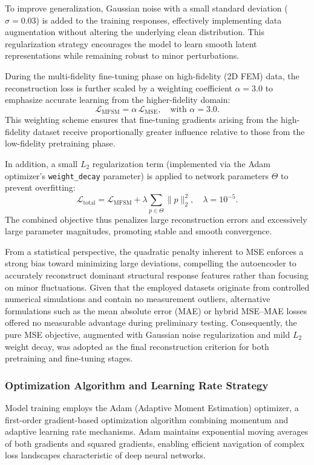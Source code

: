 \documentclass[12pt,a4paper]{report}
\begin{document}
To improve generalization, Gaussian noise with a small standard deviation ($\sigma = 0.03$) is added to the training responses, effectively implementing data augmentation without altering the underlying clean distribution. This regularization strategy encourages the model to learn smooth latent representations while remaining robust to minor perturbations.

During the multi-fidelity fine-tuning phase on high-fidelity (2D FEM) data, the reconstruction loss is further scaled by a weighting coefficient $\alpha = 3.0$ to emphasize accurate learning from the higher-fidelity domain:
\[
\mathcal{L}_{\text{MFSM}} = \alpha \, \mathcal{L}_{\text{MSE}}, \quad \text{with } \alpha = 3.0.
\]
This weighting scheme ensures that fine-tuning gradients arising from the high-fidelity dataset receive proportionally greater influence relative to those from the low-fidelity pretraining phase.

In addition, a small $L_2$ regularization term (implemented via the Adam optimizer’s \texttt{weight\_decay} parameter) is applied to network parameters $\Theta$ to prevent overfitting:
\[
\mathcal{L}_{\text{total}}
= \mathcal{L}_{\text{MFSM}}
+ \lambda \sum_{p \in \Theta} \| p \|_2^2,
\quad \lambda = 10^{-5}.
\]
The combined objective thus penalizes large reconstruction errors and excessively large parameter magnitudes, promoting stable and smooth convergence.

From a statistical perspective, the quadratic penalty inherent to MSE enforces a strong bias toward minimizing large deviations, compelling the autoencoder to accurately reconstruct dominant structural response features rather than focusing on minor fluctuations. Given that the employed datasets originate from controlled numerical simulations and contain no measurement outliers, alternative formulations such as the mean absolute error (MAE) or hybrid MSE–MAE losses offered no measurable advantage during preliminary testing. Consequently, the pure MSE objective, augmented with Gaussian noise regularization and mild $L_2$ weight decay, was adopted as the final reconstruction criterion for both pretraining and fine-tuning stages.

\subsubsection{Optimization Algorithm and Learning Rate Strategy}

Model training employs the Adam (Adaptive Moment Estimation) optimizer, a first-order gradient-based optimization algorithm combining momentum and adaptive learning rate mechanisms. Adam maintains exponential moving averages of both gradients and squared gradients, enabling efficient navigation of complex loss landscapes characteristic of deep neural networks.
\end{document}
